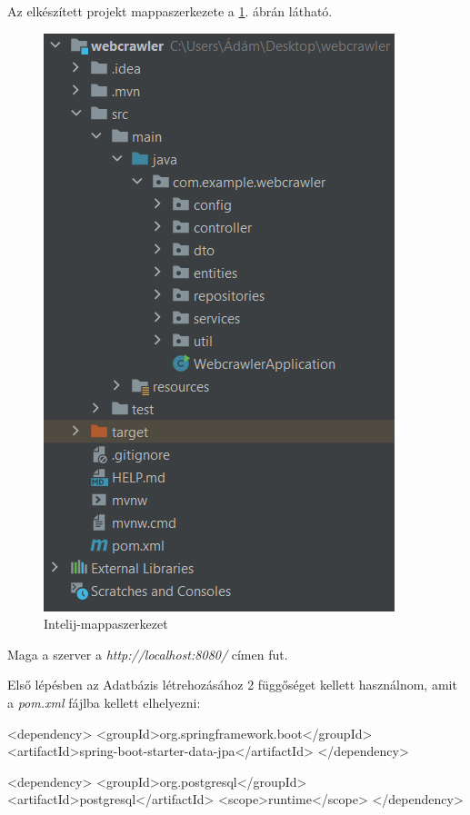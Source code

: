 Az elkészített projekt mappaszerkezete a \ref{fig:Intelij-mappaszerkezet}. ábrán látható.
\begin{figure}[h]
\centering
\includegraphics[scale=0.7]{images/Intelij-mappaszerkezet.png}
\caption{Intelij-mappaszerkezet}
\label{fig:Intelij-mappaszerkezet}
\end{figure}

Maga a szerver a \textit{http://localhost:8080/} címen fut.


Első lépésben az Adatbázis létrehozásához 2 függőséget kellett használnom, amit a \textit{pom.xml} fájlba kellett elhelyezni:
\begin{java}
<dependency>
	<groupId>org.springframework.boot</groupId>
	<artifactId>spring-boot-starter-data-jpa</artifactId>
</dependency>

<dependency>
	<groupId>org.postgresql</groupId>
	<artifactId>postgresql</artifactId>
	<scope>runtime</scope>
</dependency>
\end{java}

